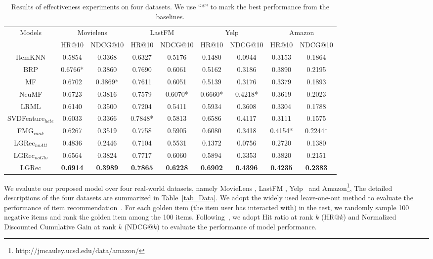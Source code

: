 \begin{table}[t]
\centering
\small
\caption{\label{tab_Effectiveness} Results of effectiveness experiments on four datasets. We use ``*'' to mark the best performance from the baselines.} %
{
\begin{tabular}{c||c|c||c|c||c|c||c|c}
\hline
\multirow{2}{*}{Models}&
\multicolumn{2}{c||}{Movielens}& \multicolumn{2}{c||}{LastFM} & \multicolumn{2}{c||}{Yelp} & \multicolumn{2}{c}{Amazon}\\
\cline{2-9}
  & {HR@10}&{NDCG@10} & {HR@10}&{NDCG@10} & {HR@10}&{NDCG@10} & {HR@10}&{NDCG@10}\\
\hline
\hline
{ItemKNN} & {0.5854} & {0.3368} & {0.6327} & {0.5176} & {0.1480} & {0.0944} & {0.3153} & {0.1864}\\
\hline
{BRP}  & {0.6766*} & {0.3860} & {0.7690} & {0.6061} & {0.5162} & {0.3186} & {0.3890} & {0.2195}\\
\hline
{MF}  & {0.6702} & {0.3869*} & {0.7611} & {0.6051} & {0.5139} & {0.3176} & {0.3379} & {0.1893}\\
\hline
{NeuMF}  & {0.6723} & {0.3816} & {0.7579} & {0.6070*} & {0.6660*} & {0.4218*} & {0.3619} & {0.2023}\\
\hline
{LRML}  & {0.6140} & {0.3500} & {0.7204} & {0.5411} & {0.5934} & {0.3608} & {0.3304} & {0.1788}\\
\hline
{SVDFeature$_{hete}$}  & {0.6033} & {0.3366} & {0.7848*} & {0.5813} & {0.6586} & {0.4117} & {0.3111} & {0.1575}\\
\hline
{FMG$_{rank}$}  & {0.6267} & {0.3519} & {0.7758} & {0.5905} & {0.6080} & {0.3418} & {0.4154*} & {0.2244*}\\
\hline
\hline
{LGRec$_{noAtt}$}  & {0.4836} & {0.2446} & {0.7104} & {0.5531} & {0.1372} & {0.0756} & {0.2720} & {0.1380}\\
\hline
{LGRec$_{noGlo}$}  & {0.6564} & {0.3824} & {0.7717} & {0.6060} & {0.5894} & {0.3353} & {0.3820} & {0.2151}\\
\hline
{LGRec}  & {\textbf{0.6914}} & {\textbf{0.3989}} & {\textbf{0.7865}} & {\textbf{0.6228}} & {\textbf{0.6902}} & {\textbf{0.4396}} & {\textbf{0.4235}} & {\textbf{0.2383}}\\
\hline
\end{tabular}}
\end{table}
 We evaluate our proposed model over four real-world datasets, namely MovieLens
, LastFM
, Yelp~\cite{hu2018leveraging}
 and Amazon\footnote{http://jmcauley.ucsd.edu/data/amazon/}, The detailed descriptions of the four datasets are summarized in Table~\ref{tab_Data}.
We adopt the widely used leave-one-out method to evaluate the performance of item recommendation~\cite{he2017neural,tay2018latent}. For each golden item (\eg the item user has interacted with) in the test, we randomly sample 100 negative items and rank the golden item among the 100 items. Following~\cite{he2017neural}, we adopt Hit ratio at rank $k$ (HR@$k$) and Normalized Discounted Cumulative Gain at rank $k$ (NDCG@$k$) to evaluate the performance of model performance.

